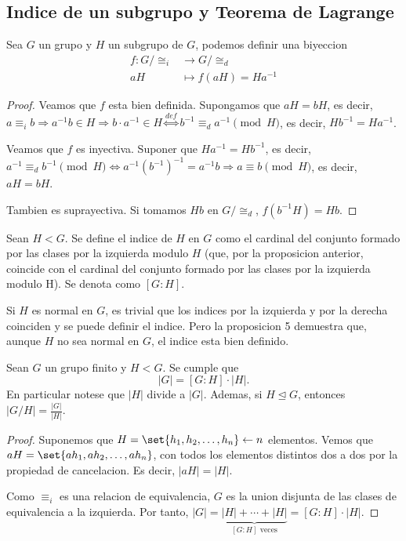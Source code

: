 \subsection{Indice de un subgrupo y Teorema de Lagrange}
\begin{proposition}
	Sea \(G \) un grupo y \(H \) un subgrupo de \(G \), podemos definir una biyeccion
	\[
		\begin{aligned}
			f \colon G / \cong_i & \longrightarrow G / \cong_d   \\
			aH                   & \longmapsto f (aH ) = Ha^{-1}
		\end{aligned}
	\]
\end{proposition}
\begin{proof}
	Veamos que \(f \) esta bien definida. Supongamos que \(aH = bH \), es decir, \(a \equiv_i b \Rightarrow a ^{-1} b \in H \Rightarrow b \cdot a^{-1} \in H \overset{def}{\iff } b^{-1} \equiv_d a^{-1} \pmod H \), es decir, \(Hb^{-1} = Ha^{-1} \).
	
	Veamos que \(f \) es inyectiva. Suponer que \(Ha^{-1} = Hb^{-1} \), es decir, \(a^{-1} \equiv_d b^{-1} \pmod H \iff a^{-1} (b^{-1} )^{-1}  = a^{-1} b \Rightarrow a \equiv b \pmod H \), es decir, \(aH = bH \).
	
	Tambien es suprayectiva. Si tomamos \(Hb \) en \(G / \cong_d \), \(f(b^{-1} H) = Hb \).
\end{proof}
\begin{definition}
	Sean \(H < G \). Se define el indice de \(H \) en \(G \) como el cardinal del conjunto formado por las clases por la izquierda modulo \(H \) (que, por la proposicion anterior, coincide con el cardinal del conjunto formado por las clases por la izquierda modulo H). Se denota como \([G \colon H ]\).
\end{definition}
\begin{remark}
	Si \(H \) es normal en \(G \), es trivial que los indices por la izquierda y por la derecha coinciden y se puede definir el indice. Pero la proposicion 5 demuestra que, aunque \(H \) no sea normal en \(G \), el indice esta bien definido.
\end{remark}

\begin{theorem}[de Lagrange]
	Sean \(G \) un grupo finito y \(H < G \). Se cumple que
	\[
		|G| = [G \colon H] \cdot |H|.
	\]
	En particular notese que \(|H| \) divide a \(|G| \). Ademas, si \(H \trianglelefteq	G \), entonces \(| G / H | = \frac{|G| }{|H| }\).
\end{theorem}
\begin{proof}
	Suponemos que \(H = \set{h_1,h_2, \ldots, h_n } \leftarrow n\) elementos. Vemos que \(aH = \set{ah_1, ah_2,\ldots, ah_n }\), con todos los elementos distintos dos a dos por la propiedad de cancelacion. Es decir, \(|aH| = |H| \).
	
	Como \(\equiv_i \) es una relacion de equivalencia, \(G \) es la union disjunta de las clases de equivalencia a la izquierda. Por tanto, \(|G| = \underbrace{|H| + \cdots + |H|}_{[G\colon H] \text{ veces} } = [G \colon H] \cdot |H|\).
	
	
\end{proof}

